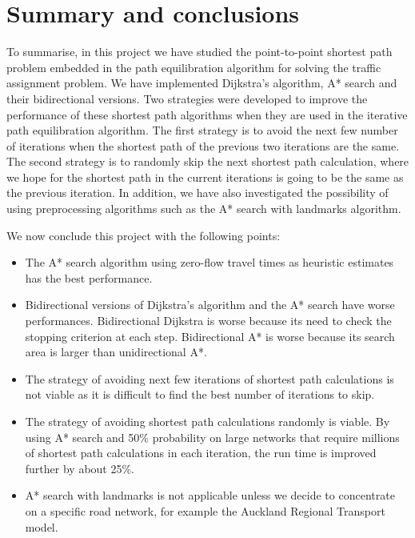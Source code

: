 \chapter{Summary and conclusions} \label{chap:conclusions}
To summarise,
in this project we have studied the point-to-point shortest path problem embedded in the path equilibration algorithm for solving the traffic assignment problem.
We have implemented Dijkstra's algorithm, A* search and their bidirectional versions.
Two strategies were developed to improve the performance of these shortest path algorithms when they are used in the iterative path equilibration algorithm.
The first strategy is to avoid the next few number of iterations
when the shortest path of the previous two iterations are the same.
The second strategy is to randomly skip the next shortest path calculation,
where we hope for the shortest path in the current iterations is going to be the same as the previous iteration.
In addition,
we have also investigated the possibility of using preprocessing algorithms such as the A* search with landmarks algorithm.

We now conclude this project with the following points:
\begin{itemize}
    \item The A* search algorithm using zero-flow travel times as heuristic estimates has the best performance.
    \item Bidirectional versions of Dijkstra's algorithm and the A* search have worse performances. Bidirectional Dijkstra is worse because its need to check the stopping criterion at each step. Bidirectional A* is worse because its search area is larger than unidirectional A*.
    \item The strategy of avoiding next few iterations of shortest path calculations is not viable as it is difficult to find the best number of iterations to skip.
    \item The strategy of avoiding shortest path calculations randomly is viable. By using A* search and 50\% probability on large networks that require millions of shortest path calculations in each iteration, the run time is improved further by about 25\%.
    \item A* search with landmarks is not applicable unless we decide to concentrate on a specific road network, for example the Auckland Regional Transport model.
\end{itemize}

